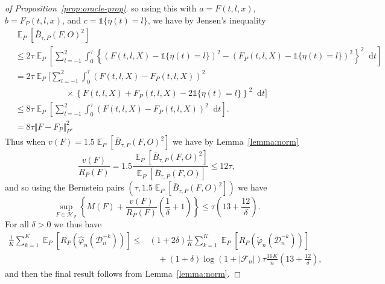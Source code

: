 \documentclass[lineno]{biometrika}
\DeclareMathOperator{\E}{\mathbb{E}} %
\renewcommand{\phi}{\varphi}
\newcommand*\diff{\mathop{}\!\mathrm{d}}
\newcommand{\1}{\mathds{1}}
\newcommand{\data}{\ensuremath{\mathcal{D}}}
\begin{document}
\begin{proof}[of Proposition~\ref{prop:oracle-prop}]
so using this with \( a=F(t, l, x) \), \( b=F_P(t, l, x) \), and
\( c = \1{\{\eta(t) = l\}} \), we have by Jensen's inequality
\begin{align*}
  & \E_P{[\bar{B}_{\tau,P}(F, O)^2]}
  \\
  & \leq
    2\tau\E_{P}{\left[
    \sum_{l=-1}^{2} \int_0^{\tau}
    \left\{
    \left(
    F(t, l, X) - \1{\{\eta(t) = l\}}
    \right)^2
    -
    \left(
    F_P(t, l, X) - \1{\{\eta(t) = l\}}
    \right)^2
    \right\}^2
    \diff t 
    \right]}
  \\
  & =2\tau
    \E_{P}\Bigg[
    \sum_{l=-1}^{2} \int_0^{\tau}
    \left(
    F(t, l, X) - F_P(t, l, X)
    \right)^2
  \\
  & \quad \quad \quad\quad \quad \quad \times
    \left\{
    F(t, l, X) +  F_P(t, l, X)-2 \1{\{\eta(t) = l\}}
    \right\}^2
    \diff t 
    \Bigg]
  \\
  & \leq
    8\tau \E_{P}{\left[
    \sum_{l=-1}^{2} \int_0^{\tau}
    \left(
    F(t, l, X) - F_P(t, l, X)
    \right)^2
    \diff t 
    \right]}.
  \\
  & =
    8\tau \Vert F - F_P \Vert_{P}^2.
\end{align*}
Thus when \( v(F) = 1.5 \E_P{[\bar{B}_{\tau,P}(F, O)^2]} \) we have by
Lemma~\ref{lemma:norm}
\begin{equation*}
  \frac{v(F)}{R_P(F)}
  = 1.5 \frac{\E_P{[\bar{B}_{\tau,P}(F, O)^2]}}{\E_P{[\bar{B}_{\tau,P}(F, O)]}}
  \leq 12 \tau,
\end{equation*}
and so using the Bernstein pairs \( (\tau, 1.5 \E_P{[\bar{B}_{\tau,P}(F, O)^2]}) \) we have
\begin{equation*}
  \sup_{F \in \mathcal{H}_{\mathcal{P}}}
  \left\{
    M(F) + \frac{v(F)}{R_P(F)}
    \left(
      \frac{1}{\delta} + 1
    \right)
  \right\}
  \leq \tau
  \left(
    13 + \frac{12}{\delta}
  \right).
\end{equation*}
For all $\delta>0$ we thus have
\begin{align*}
  \frac{1}{K} \sum_{k=1}^{K} \E_{P}{\left[ R_P(\hat{\phi}_n(\data_n^{-k})) \right]}
  \leq
  &(1+2\delta)\frac{1}{K} \sum_{k=1}^{K}\E_{P}{\left[ R_P(\tilde{\phi}_n(\data_n^{-k})) \right]}
  \\
  & \quad
    + (1+\delta)\log(1 + |\mathcal{F}_n|) \tau \frac{16 K}{n}
    \left(
    13 + \frac{12}{\delta}
    \right),
\end{align*}
and then the final result follows from Lemma~\ref{lemma:norm}.
\end{proof}
\end{document}
